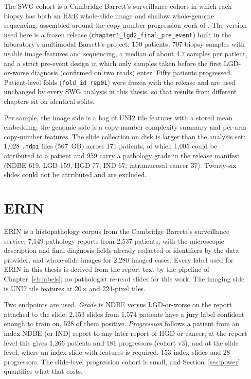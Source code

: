 The SWG cohort is a Cambridge Barrett's surveillance cohort in which each biopsy has both an H\&E whole-slide image and shallow whole-genome sequencing, assembled around the copy-number progression work of \citet{killcoyne2020}. The version used here is a frozen release (\texttt{chapter1\_lgd2\_final\_pre\_event}) built in the laboratory's multimodal Barrett's project: 150 patients, 707 biopsy samples with usable image features and sequencing, a median of about 4.7 samples per patient, and a strict pre-event design in which only samples taken before the first LGD-or-worse diagnosis (confirmed on two reads) enter. Fifty patients progressed. Patient-level folds (\texttt{fold\_id\_rep01}) were frozen with the release and are used unchanged by every SWG analysis in this thesis, so that results from different chapters sit on identical splits.

Per sample, the image side is a bag of UNI2 tile features \citep{chen2024uni} with a stored mean embedding; the genomic side is a copy-number complexity summary and per-arm copy-number features. The slide collection on disk is larger than the analysis set: 1,028 \texttt{.ndpi} files (567~GB) across 171 patients, of which 1,005 could be attributed to a patient and 959 carry a pathology grade in the release manifest (NDBE 619, LGD 159, HGD 77, IND 67, intramucosal cancer 37). Twenty-six slides could not be attributed and are excluded.

\section{ERIN}
\label{sec:erin}

ERIN is a histopathology corpus from the Cambridge Barrett's surveillance service: 7,149 pathology reports from 2,537 patients, with the microscopic description and final diagnosis fields already redacted of identifiers by the data provider, and whole-slide images for 2,280 imaged cases. Every label used for ERIN in this thesis is derived from the report text by the pipeline of Chapter~\ref{ch:labels}; no pathologist re-read slides for this work. The imaging side is UNI2 tile features at 20$\times$ and 224-pixel tiles.

Two endpoints are used. \emph{Grade} is NDBE versus LGD-or-worse on the report attached to the slide; 2,153 slides from 1,574 patients have a jury label confident enough to train on, 528 of them positive. \emph{Progression} follows a patient from an index NDBE (or IND) report to any later report of HGD or cancer; at the report level this gives 1,266 patients and 181 progressors (cohort v3), and at the slide level, where an index slide with features is required, 153 index slides and 28 progressors. The slide-level progression cohort is small, and Section~\ref{sec:power} quantifies what that costs.

